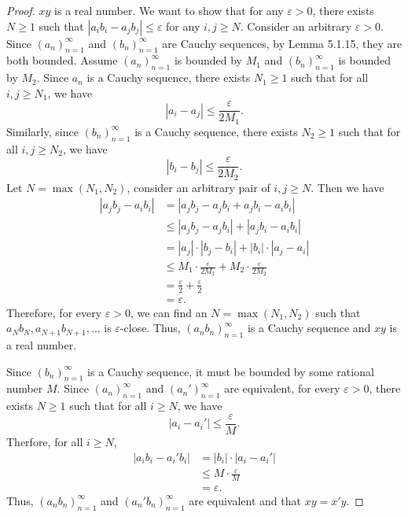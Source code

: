 \documentclass[12pt, letter]{article}
\newcommand{\an}{$(a_n)_{n=1}^\infty$ }
\newcommand{\bn}{$(b_n)_{n=1}^\infty$ }
\begin{document}
\begin{proof}
    $xy$ is a real number. We want to show that for any $\varepsilon>0$, there exists $N\geq 1$ such that $|a_i b_i-a_j b_j|\leq\varepsilon$ for any $i,j\geq N$. Consider an 
    arbitrary $\varepsilon>0$. Since \an and \bn are Cauchy sequences, by Lemma 5.1.15, they are both bounded. Assume \an is bounded by $M_1$ and \bn is bounded by $M_2$. Since $a_n$ is a Cauchy sequence, there exists $N_1\geq 1$ such that
    for all $i,j\geq N_1$, we have 
    \begin{equation*}
        |a_i-a_j|\leq \frac{\varepsilon}{2M_1}.
    \end{equation*} 
    Similarly, since \bn is a Cauchy sequence, there exists $N_2\geq 1$ such that for all $i,j\geq N_2$, we have 
    \begin{equation*}
        |b_i-b_j|\leq \frac{\varepsilon}{2M_2}.
    \end{equation*}
    Let $N=\max(N_1,N_2)$, consider an arbitrary pair of $i,j\geq N$. Then we have 
    \begin{equation*}
        \begin{aligned}
            |a_j b_j-a_i b_i|&=|a_j b_j-a_j b_i+a_j b_i-a_i b_i|\\
            &\leq |a_j b_j-a_j b_i|+|a_j b_i-a_i b_i|\\
            &=|a_j|\cdot |b_j-b_i|+|b_i|\cdot |a_j-a_i|\\
            &\leq M_1\cdot \frac{\varepsilon}{2M_1}+M_2\cdot\frac{\varepsilon}{2M_2}\\
            &=\frac{\varepsilon}{2}+\frac{\varepsilon}{2}\\
            &=\varepsilon.
        \end{aligned}
    \end{equation*}
    Therefore, for every $\varepsilon>0$, we can find an $N=\max(N_1,N_2)$ such that $a_N b_N,a_{N+1}b_{N+1},\dotsc$ is $\varepsilon$-close. Thus, $(a_n b_n)_{n=1}^\infty$
    is a Cauchy sequence and $xy$ is a real number.

    Since \bn is a Cauchy sequence, it must be bounded by some rational number $M$. Since \an and $(a_n')_{n=1}^\infty$ are equivalent, for every $\varepsilon>0$, there exists $N\geq 1$ such that 
    for all $i\geq N$, we have 
    \begin{equation*}
        |a_i-a_i'|\leq \frac{\varepsilon}{M}.
    \end{equation*}
    Therfore, for all $i\geq N$, 
    \begin{equation*}
        \begin{aligned}
            |a_i b_i-a_i' b_i|&=|b_i|\cdot |a_i-a_i'|\\
            &\leq M\cdot \frac{\varepsilon}{M}\\
            &=\varepsilon.
        \end{aligned}
    \end{equation*}
    Thus, $(a_n b_n)_{n=1}^\infty$ and $(a_n' b_n)_{n=1}^\infty$ are equivalent and that $xy=x'y$. 
\end{proof}
\end{document}
